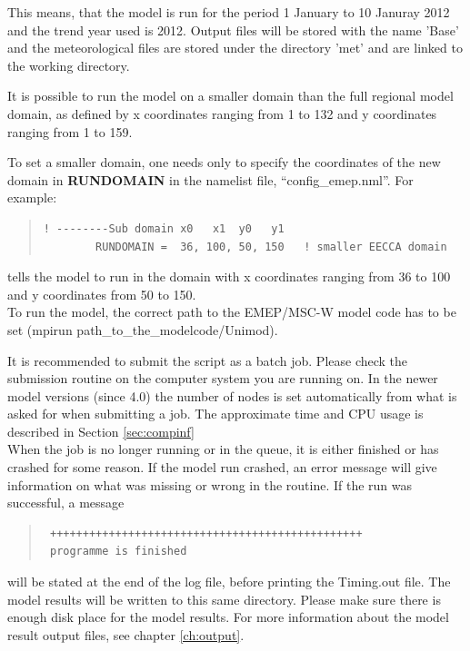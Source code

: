 \documentclass[a4paper,12pt]{report}
\begin{document}
 This means, that the model is run for the period 1 January to 10 Januray 2012 and the trend year 
 used is 2012.  Output files will be stored with the name 'Base' and the meteorological files are stored
 under the directory 'met' and are linked to the working directory. 

It is possible to run the model on a smaller domain than the full
regional model domain, as defined by  x coordinates ranging
from 1 to 132 and y coordinates ranging from 1 to 159. 

To set a smaller domain, one needs only to specify the
coordinates of the new domain in {\bf RUNDOMAIN} in the namelist file,  
 ``config\_emep.nml''. For example:

\begin{quote}
\begin{verbatim}
! --------Sub domain x0   x1  y0   y1
        RUNDOMAIN =  36, 100, 50, 150   ! smaller EECCA domain
\end{verbatim}
\end{quote}

tells the model to run in the domain with x coordinates ranging from
36 to 100 and y coordinates from 50 to 150.\\ 

To run the model, the correct path to the EMEP/MSC-W model code 
has to be set (mpirun path\_to\_the\_\-modelcode/Unimod).  

It is recommended to submit the script as a batch job. Please check the 
submission routine on the computer system you are running on. 
In the newer model versions (since 4.0) the number of nodes is set 
automatically from what is asked for when submitting a job. 
The approximate time and CPU usage is described in Section \ref{sec:compinf}\\

When the job is no longer running or in the queue, it is either finished or has crashed for some reason.  
If the model run crashed, an error message will give information on what was missing or wrong in the routine.  
If the run was successful, a message
\begin{quote}
\begin{verbatim}
 ++++++++++++++++++++++++++++++++++++++++++++++++
 programme is finished
\end{verbatim}
\end{quote}
will be stated at the end of the log file, before printing the Timing.out file.   
The model results will be written to this same directory. Please make 
sure there is enough disk place for the model results. 
For more information about the model result output files, see chapter \ref{ch:output}.\\
\end{document}
